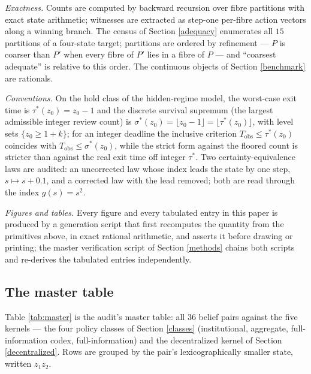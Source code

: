 \documentclass[10pt,twocolumn]{article}
\theoremstyle{definition}
\begin{document}
\emph{Exactness.} Counts are computed by backward recursion over fibre
partitions with exact state arithmetic; witnesses are extracted as
step-one per-fibre action vectors along a winning branch. The census of
Section \ref{adequacy} enumerates all \(15\) partitions of a four-state
target; partitions are ordered by refinement --- \(P\) is coarser than
\(P'\) when every fibre of \(P'\) lies in a fibre of \(P\) --- and
``coarsest adequate'' is relative to this order. The continuous objects of Section \ref{benchmark} are rationals.

\emph{Conventions.} On the hold class of the hidden-regime model, the
worst-case exit time is \(\tau^{*}(z_0) = z_0 - 1\) and the discrete
survival supremum (the largest admissible integer review count) is
\(\sigma^{*}(z_0) = \lfloor z_0 - 1 \rfloor = \lfloor \tau^{*}(z_0)
\rfloor\), with level sets \(\{z_0 \ge 1 + k\}\); for an integer deadline
the inclusive criterion \(T_{\mathrm{obs}} \le \tau^{*}(z_0)\) coincides
with \(T_{\mathrm{obs}} \le \sigma^{*}(z_0)\), while the strict form
against the floored count is stricter than against the real exit time off
integer \(\tau^{*}\). Two
certainty-equivalence laws are audited: an uncorrected law whose index
leads the state by one step, \(s \mapsto s + 0.1\), and a corrected law
with the lead removed; both are read through the index \(g(s) = s^{2}\).

\emph{Figures and tables.} Every figure and every tabulated entry in
this paper is produced by a generation script that first recomputes the
quantity from the primitives above, in exact rational arithmetic, and
asserts it before drawing or printing; the master verification script of
Section \ref{methods} chains both scripts and re-derives the tabulated
entries independently.

\subsection{The master table}\label{master}

Table \ref{tab:master} is the audit's master table: all 36 belief pairs
against the five kernels --- the four policy classes of Section
\ref{classes} (institutional, aggregate, full-information codex,
full-information) and the decentralized kernel of Section
\ref{decentralized}. Rows are grouped by the pair's lexicographically
smaller state, written \(z_1 z_2\).
\end{document}
